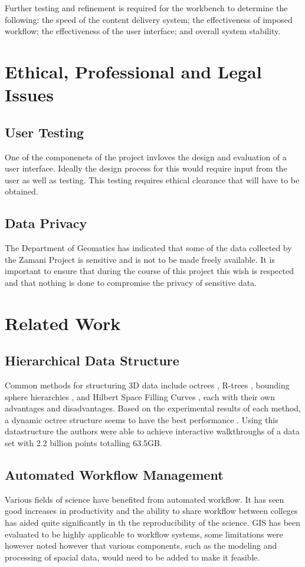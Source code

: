 \documentclass[12pt,a4paper]{article}
\begin{document}
Further testing and refinement is required for the workbench
to determine the  following: the speed of the content
delivery system; the effectiveness of imposed workflow; the
effectiveness of the user interface; and overall system stability.


\section{Ethical, Professional and Legal Issues}
\subsection{User Testing}
One of the componenets of the project invloves the design and evaluation
of a user interface. Ideally the design process for this would require
input from the user as well as testing. This testing requires ethical clearance
that will have to be obtained.
\subsection{Data Privacy}
The Department of Geomatics has indicated that some of the data collected by
the Zamani Project is sensitive and is not to be made freely available. It is
important to ensure that during the course of this project this wish is respected
and that nothing is done to compromise the privacy of sensitive data.



\section{Related Work}
\subsection{Hierarchical Data Structure}
Common methods for structuring 3D data include octrees \cite{interactivepointclouds},
R-trees \cite{rtree}, bounding sphere hierarchies \cite{qsplat}, and Hilbert Space
Filling Curves \cite{hilbert}, each with their own advantages and disadvantages. Based
on the experimental results of each method, a dynamic octree structure seems to have
the best performance \cite{interactivepointclouds}. Using this datastructure the
authors were able to achieve interactive walkthroughs of a data set with 2.2
billion points totalling 63.5GB.

\subsection{Automated Workflow Management}
Various fields of science have benefited from automated workflow. It has
seen good increases in productivity \cite{Brahe:2007:SWW:1316624.1316661} and the ability to share
workflow between colleges has aided quite significantly in th the reproducibility
of the science\cite{4721191}. GIS has been evaluated to be highly applicable to
workflow systems\cite{migliorini2011workflow}, some limitations were however noted however that
various components, such as the modeling and processing of spacial data,
would need to be added to make it feasible.
\end{document}
